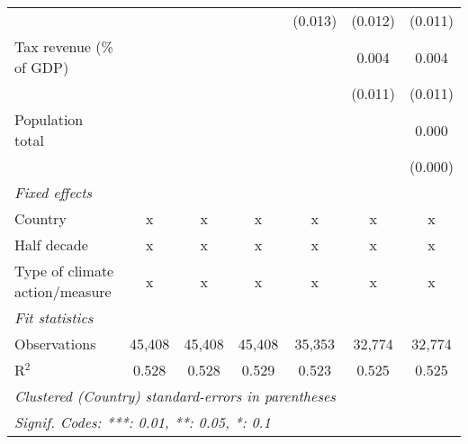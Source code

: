 \begin{tabular}{lcccccc}
                                                             &         &              &               & (0.013)        & (0.012)        & (0.011)\\   
   Tax revenue (\% of GDP)                                   &         &              &               &                & 0.004          & 0.004\\   
                                                             &         &              &               &                & (0.011)        & (0.011)\\   
   Population total                                          &         &              &               &                &                & 0.000\\   
                                                             &         &              &               &                &                & (0.000)\\   
   \emph{Fixed effects}\\
   Country                                                   & x       & x            & x             & x              & x              & x\\  
   Half decade                                               & x       & x            & x             & x              & x              & x\\  
   Type of climate action/measure                            & x       & x            & x             & x              & x              & x\\  
   \midrule \emph{Fit statistics}\\
   Observations                                              & 45,408  & 45,408       & 45,408        & 35,353         & 32,774         & 32,774\\  
   R$^2$                                                     & 0.528   & 0.528        & 0.529         & 0.523          & 0.525          & 0.525\\  
   \midrule
   \multicolumn{7}{l}{\emph{Clustered (Country) standard-errors in parentheses}}\\
   \multicolumn{7}{l}{\emph{Signif. Codes: ***: 0.01, **: 0.05, *: 0.1}}\\
\end{tabular}
\par\endgroup


